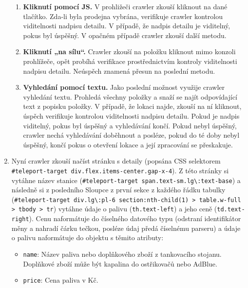 \begin{enumerate}
        \begin{enumerate}
            \item \textbf{Kliknutí pomocí JS.} V prohližeči crawler zkouší
                kliknout na dané tlačítko. Zda-li byla prodejna vybrána,
                verifikuje crawler kontrolou viditelnosti nadpisu detailu.
                V případě, že nadpis detailu je viditelný, pokus byl úspěšný.
                V opačném případě crawler zkouší další metodu.
            \item \textbf{Kliknutí „na sílu“.} Crawler zkouší na položku
                kliknout mimo konzoli prohlížeče, opět probíhá verifikace
                prostřednictvím kontroly viditelnosti nadpisu detailu.
                Neúspěch znamená přesun na poslední metodu.
            \item \textbf{Vyhledání pomocí textu.} Jako poslední možnost
                využije crawler vyhledání textu. Prohledá všechny položky
                a snaží se najít odpovídající text z popisku položky.
                V případě, že lokaci najde, zkouší na ní kliknout, úspěch
                verifikuje kontrolou viditelnosti nadpisu detailu. Pokud
                je nadpis viditelný, pokus byl úspěšný a vyhledávání končí.
                Pokud nebyl úspěšný, crawler nechá vyhledávání doběhnout
                a posléze, pokud do té doby nebyl úspěšný, končí pokus
                o otevření lokace a její zpracování se přeskakuje.
        \end{enumerate}
    \item Nyní crawler zkouší načíst stránku s detaily (popsána CSS
        selektorem \texttt{\#teleport-target div.flex.items-center.gap-x-4}).
        Z této stránky si vytáhne název stanice (\texttt{\#teleport-target
        span.text-sm.lg\textbackslash:text-base}) a následně si z posledního 
        Sloupce z první sekce z každého řádku tabulky
        (\texttt{\#teleport-target
        div.lg\textbackslash:pl-6 section:nth-child(1)
        > table.w-full > tbody > tr}) vytáhne údaje o palivu
        (\texttt{th.text-left}) a jeho ceně (\texttt{td.text-right}). Cenu
        naformátuje do číselného datového typu (odstraní identifikátor měny
        a nahradí čárku tečkou, posléze údaj předá číselnému parseru)
        a údaje o palivu naformátuje do objektu s těmito atributy:
        
        \begin{itemize}
            \item \texttt{name}: Název paliva nebo doplňkového zboží z tankovacího
                stojanu. Doplňkové zboží může být kapalina do ostřikovačů nebo AdBlue.
            \item \texttt{price}: Cena paliva v Kč.
        \end{itemize}
        

\end{enumerate}
